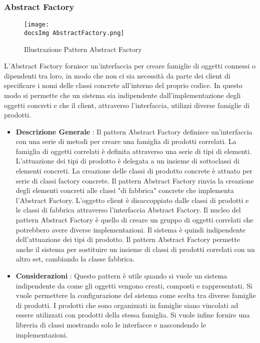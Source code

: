 {{		\subsubsection{Abstract Factory}{
			\begin{figure}[ht]
				\centering
				\texttt{[image: \\docsImg AbstractFactory.png]}
				\caption{Illustrazione Pattern Abstract Factory}
				\label{Illustrazione Pattern Abstract Factory}
			\end{figure}
			L'Abstract Factory fornisce un'interfaccia per creare famiglie di oggetti connessi o dipendenti tra loro, in modo che non ci sia necessità da parte dei client di specificare i nomi delle classi concrete all'interno del proprio codice.
			In questo modo si permette che un sistema sia indipendente dall'implementazione degli oggetti concreti e che il client, attraverso l'interfaccia, utilizzi diverse famiglie di prodotti.
			\begin{itemize}\itemsep1pt
				\item \textbf{Descrizione Generale} : Il pattern Abstract Factory definisce un'interfaccia con una serie di metodi per creare una famiglia di prodotti correlati. La famiglia di oggetti correlati è definita attraverso una serie di tipi di elementi. L'attuazione dei tipi di prodotto è delegata a un insieme di sottoclassi di elementi concreti. La creazione delle classi di prodotto concrete è attuato per serie di classi factory concrete. Il pattern Abstract Factory rinvia la creazione degli elementi concreti alle classi "di fabbrica" concrete che implementa l'Abstract Factory. L'oggetto client è disaccoppiato dalle classi di prodotti e le classi di fabbrica attraverso l'interfaccia Abstract Factory. Il nucleo del pattern Abstract Factory è quello di creare un gruppo di oggetti correlati che potrebbero avere diverse implementazioni. Il sistema è quindi indipendente dell'attuazione dei tipi di prodotto. Il pattern Abstract Factory permette anche il sistema per sostituire un insieme di classi di prodotti correlati con un altro set, cambiando la classe fabbrica.
				\item \textbf{Considerazioni} : Questo pattern è utile quando si vuole un sistema indipendente da come gli oggetti vengono creati, composti e rappresentati. Si vuole permettere la configurazione del sistema come scelta tra diverse famiglie di prodotti. I prodotti che sono organizzati in famiglie siano vincolati ad essere utilizzati con prodotti della stessa famiglia. Si vuole infine fornire una libreria di classi mostrando solo le interfacce e nascondendo le implementazioni.

\end{itemize}}}}
